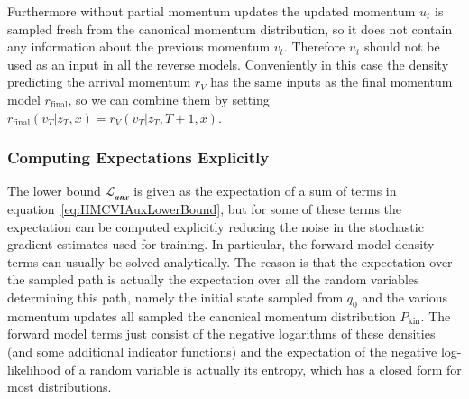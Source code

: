 Furthermore without partial momentum updates the updated momentum $u_t$ is sampled fresh from the canonical momentum distribution, so it does not contain any information about the previous momentum $v_t$. Therefore $u_t$ should not be used as an input in all the reverse models. Conveniently in this case the density predicting the arrival momentum $r_V$ has the same inputs as the final momentum model $r_\textrm{final}$, so we can combine them by setting $r_\textrm{final}(v_T | z_T, x) = r_V(v_T | z_T, T+1, x)$.

\subsubsection{Computing Expectations Explicitly}

The lower bound $\mathcal{L_\textrm{aux}}$ is given as the expectation of a sum of terms in equation~\eqref{eq:HMCVIAuxLowerBound}, but for some of these terms the expectation can be computed explicitly reducing the noise in the stochastic gradient estimates used for training. In particular, the forward model density terms can usually be solved analytically. The reason is that the expectation over the sampled path is actually the expectation over all the random variables determining this path, namely the initial state sampled from $q_0$ and the various momentum updates all sampled the canonical momentum distribution $P_\textrm{kin}$. The forward model terms just consist of the negative logarithms of these densities (and some additional indicator functions) and the expectation of the negative log-likelihood of a random variable is actually its entropy, which has a closed form for most distributions.
